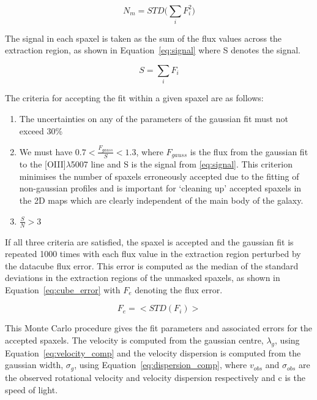 \documentclass[fleqn,usenatbib]{mn2e}
\begin{document}
\begin{equation}\label{eq:mask_noise}
    N_{m} = STD\big(\sum_{i}F_{i}^{2}\big)
\end{equation}

The signal in each spaxel is taken as the sum of the flux values across the extraction region, as shown in Equation~\ref{eq:signal} where S denotes the signal.

\begin{equation}\label{eq:signal}
    S = \sum_{i}F_{i}
\end{equation}

The criteria for accepting the fit within a given spaxel are as follows:

\begin{enumerate}
\item The uncertainties on any of the parameters of the gaussian fit must not exceed 30\%
\item We must have $ 0.7 < \frac{F_{gauss}}{S} < 1.3 $, where $F_{gauss}$ is the flux from the gaussian fit to the [OIII]$\lambda$5007 line and S is the signal from \ref{eq:signal}. This criterion minimises the number of spaxels erroneously accepted due to the fitting of non-gaussian profiles and is important for `cleaning up' accepted spaxels in the 2D maps which are clearly independent of the main body of the galaxy.
\item $\frac{S}{N} > 3$
\end{enumerate}

If all three criteria are satisfied, the spaxel is accepted and the gaussian fit is repeated 1000 times with each flux value in the extraction region perturbed by the datacube flux error.
This error is computed as the median of the standard deviations in the extraction regions of the unmasked spaxels, as shown in Equation~\ref{eq:cube_error} with $F_{e}$ denoting the flux error.  

\begin{equation}\label{eq:cube_error}
   F_{e} = \big<STD(F _{i})\big>
\end{equation}

This Monte Carlo procedure gives the fit parameters and associated errors for the accepted spaxels.
The velocity is computed from the gaussian centre, $\lambda_{g}$, using Equation~\ref{eq:velocity_comp} and the velocity dispersion is computed from the gaussian width, $\sigma_{g}$, using Equation~\ref{eq:dispersion_comp}, where $v_{obs}$ and $\sigma_{obs}$ are the observed rotational velocity and velocity dispersion respectively and c is the speed of light.
\end{document}
